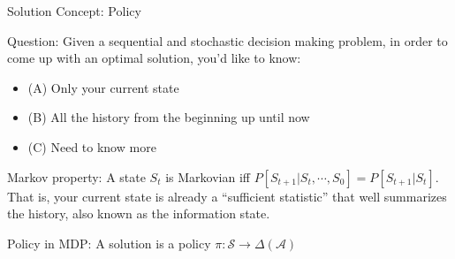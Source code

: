 \documentclass{beamer}
\begin{document}
\begin{frame}{Solution Concept: Policy}
    \begin{exampleblock}{Question:}
        Given a sequential and stochastic decision making problem, in order to come up with an optimal solution, you'd like to know:
        \begin{itemize}
            \item (A) Only your current state

            \item (B) All the history from the beginning up until now

            \item (C) Need to know more
        \end{itemize}
    \end{exampleblock}

    \pause
    \begin{exampleblock}{Markov property:}
        A state $S_t$ is Markovian iff $P[S_{t+1}| S_{t}, \cdots, S_0] = P[S_{t+1}| S_{t}]$.
        That is, your current state is already a ``sufficient statistic'' that well summarizes the history,
        also known as the \alert{information state}.
    \end{exampleblock}

    \pause
    \begin{exampleblock}{Policy in MDP:}
        A solution is a policy $\pi: \mathcal{S} \rightarrow \Delta(\mathcal{A})$ 
    \end{exampleblock}

\end{frame}
\end{document}
